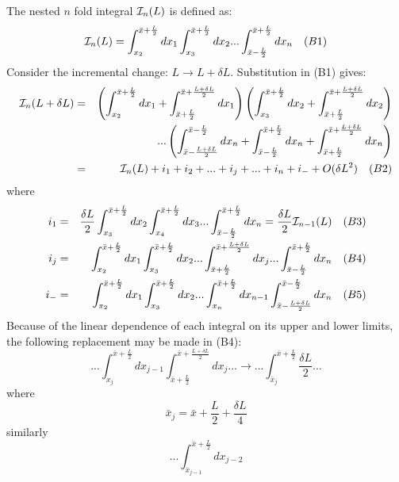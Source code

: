 {  \par The nested $n$ fold integral ${\cal I}_n(L)$ is defined as:
 \[ {\cal I}_n(L) =  \int_{x_2}^{\bar{x} +\frac{L}{2}} d x_1  \int_{x_3}^{\bar{x} +\frac{L}{2}} d x_2
  ... \int_{\bar{x} -\frac{L}{2}}^{\bar{x} +\frac{L}{2}} dx_n~~~(B1) \]
  Consider the incremental change: $L \rightarrow L + \delta L$. Substitution in (B1) gives:
  \begin{eqnarray}
  {\cal I}_n(L+\delta L) & = & \left( \int_{x_2}^{\bar{x} +\frac{L}{2}}d x_1
    +  \int_{\bar{x} +\frac{L}{2}}^{\bar{x} +\frac{L+\delta L}{2}}d x_1 \right)
   \left( \int_{x_3}^{\bar{x} +\frac{L}{2}}d x_2
    +  \int_{\bar{x} +\frac{L}{2}}^{\bar{x} +\frac{L+\delta L}{2}}d x_2 \right)
 \nonumber \\
      &   & ...\left( \int_{\bar{x} -\frac{L+\delta L}{2}}^{\bar{x} -\frac{L}{2}}d x_n
      +  \int_{\bar{x} -\frac{L}{2}}^{\bar{x} +\frac{L}{2}}d x_n
    +  \int_{\bar{x} +\frac{L }{2}}^{\bar{x} +\frac{L+\delta L}{2}}d x_n \right) 
   \nonumber \\
    & = &   {\cal I}_n(L) +i_1 + i_2 +...+i_j+ ...+i_n + i_- +O(\delta L^2) \nonumber ~~~(B2)
 \end{eqnarray}
   where
  \begin{eqnarray}
  i_1 & = & \frac{\delta L}{2} \int_{x_3}^{\bar{x} +\frac{L}{2}} d x_2 
   \int_{x_4}^{\bar{x} +\frac{L}{2}} d x_3...
    \int_{\bar{x} -\frac{L}{2}}^{\bar{x} +\frac{L}{2}} dx_n
     = \frac{\delta L}{2}{\cal I}_{n-1}(L) \nonumber~~~(B3) \\ 
    i_j & = & \int_{x_2}^{\bar{x} +\frac{L}{2}} d x_1 
   \int_{x_3}^{\bar{x} +\frac{L}{2}} d x_2...
 \int_{\bar{x} +\frac{L}{2}}^{\bar{x} +\frac{L+\delta L}{2}} d x_j...
    \int_{\bar{x} -\frac{L}{2}}^{\bar{x} +\frac{L}{2}} dx_n \nonumber~~~(B4) \\
    i_- & = & \int_{x_2}^{\bar{x} +\frac{L}{2}} d x_1 
   \int_{x_3}^{\bar{x} +\frac{L}{2}} d x_2...
 \int_{x_n}^{\bar{x} +\frac{L}{2}} d x_{n-1}
    \int_{\bar{x} -\frac{L+\delta L}{2}}^{\bar{x} -\frac{L}{2}} dx_n \nonumber~~~(B5)
  \end{eqnarray}
  Because of the linear dependence of each integral on its upper and lower limits, the 
  following replacement may be made in (B4):
   \[... \int_{x_j}^{\bar{x} +\frac{L}{2}} d x_{j-1} 
   \int_{\bar{x} +\frac{L}{2}}^{\bar{x} +\frac{L+\delta L}{2}} d x_j...
    \rightarrow ... \int_{\bar{x}_j}^{\bar{x} +\frac{L}{2}} \frac{\delta L}{2}... \]
      where
     \[\bar{x}_j = \bar{x} +\frac{L}{2}+ \frac{\delta L}{4} \]
     similarly
 \[ ... \int_{\bar{x}_{j-1}}^{\bar{x} +\frac{L}{2}} d x_{j-2}
\]}

